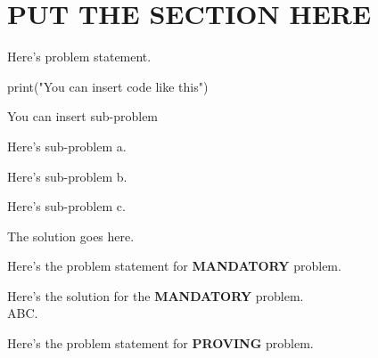 \documentclass[a4paper, 10pt]{article}
\begin{document}
\subject
{}

\section{PUT THE SECTION HERE}

\begin{problem}
Here's problem statement.
\begin{codingbox}
    print("You can insert code like this")
\end{codingbox}
You can insert sub-problem
\begin{subproblems}
	\item Here's sub-problem a.
	\item Here's sub-problem b.
	\item Here's sub-problem c.
\end{subproblems}
\end{problem}

\begin{solution}
	The solution goes here.
\end{solution}

\begin{problem}
Here's the problem statement for \textbf{MANDATORY} problem.
\end{problem}

\begin{tosubmit}
	Here's the solution for the \textbf{MANDATORY} problem. \\
	ABC.
\end{tosubmit}

\begin{problem}
Here's the problem statement for \textbf{PROVING} problem.
\end{problem}
\end{document}
